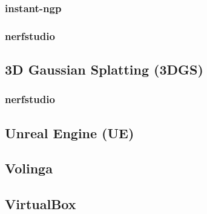 \documentclass[a4paper, 12pt, spanish, twoside]{article}
\begin{document}
\subsubsection{instant-ngp} \label{sec:herramientas:nerf:instant-ngp}

\subsubsection{nerfstudio} \label{sec:herramientas:nerf:nerfstudio}


\subsection{3D Gaussian Splatting (3DGS)} \label{sec:herramientas:3dgs}

\subsubsection{nerfstudio} \label{sec:herramientas:3dgs:nerfstudio}


\subsection{Unreal Engine (UE)} \label{sec:herramientas:ue}


\subsection{Volinga} \label{sec:herramientas:volinga}


\subsection{VirtualBox} \label{sec:herramientas:virtualbox}
\end{document}
